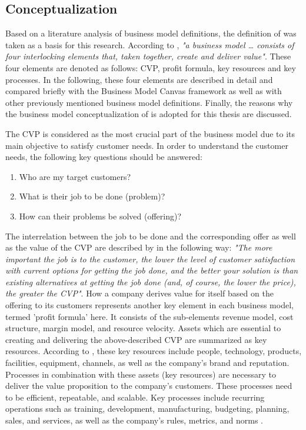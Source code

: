 \subsection{Conceptualization}\label{ch:tf:bmc}

Based on a literature analysis of business model definitions, the definition of \citet{Johnson2008} was taken as a basis for this research. According to \citet[p. 52]{Johnson2008}, \textit{"a business model \ldots\xspace consists of four interlocking elements that, taken together, create and deliver value"}. These four elements are denoted as follows: \ac{CVP}, profit formula, key resources and key processes. In the following, these four elements are described in detail and compared briefly with the Business Model Canvas framework \citep{Osterwalder2010} as well as with other previously mentioned business model definitions. Finally, the reasons why the business model conceptualization of \citet{Johnson2008} is adopted for this thesis are discussed.

The \ac{CVP} is considered as the most crucial part of the business model due to its main objective to satisfy customer needs. In order to understand the customer needs, the following key questions should be answered: 

\begin{enumerate}[parsep=0pt, topsep=0pt, itemsep=0pt]
	\item Who are my target customers?
	\item What is their job to be done (problem)?
	\item How can their problems be solved (offering)? 
\end{enumerate}

The interrelation between the job to be done and the corresponding offer as well as the value of the \ac{CVP} are described by  \citet[p. 52]{Johnson2008} in the following way: \textit{"The more important the job is to the customer, the lower the level of customer satisfaction with current options for getting the job done, and the better your solution is than existing alternatives at getting the job done (and, of course, the lower the price), the greater the \ac{CVP}"}. How a company derives value for itself based on the offering to its customers represents another key element in each business model, termed 'profit formula' here. It consists of the sub-elements revenue model, cost structure, margin model, and resource velocity. Assets which are essential to creating and delivering the above-described \ac{CVP} are summarized as key resources. According to \citet[p. 53]{Johnson2008}, these key resources include people, technology, products, facilities, equipment, channels, as well as the company's brand and reputation. Processes in combination with these assets (key resources) are necessary to deliver the value proposition to the company's customers. These processes need to be efficient, repeatable, and scalable. Key processes include recurring operations such as training, development, manufacturing, budgeting, planning, sales, and services, as well as the company's rules, metrics, and norms \citep[p. 53]{Johnson2008}.

